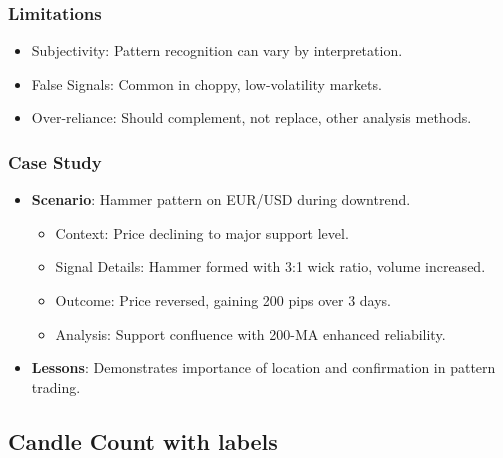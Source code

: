 \documentclass[12pt]{article}
\begin{document}
\subsubsection{Limitations}
\begin{itemize}
\item Subjectivity: Pattern recognition can vary by interpretation.
\item False Signals: Common in choppy, low-volatility markets.
\item Over-reliance: Should complement, not replace, other analysis methods.
\end{itemize}

\subsubsection{Case Study}
\begin{itemize}
\item \textbf{Scenario}: Hammer pattern on EUR/USD during downtrend.
  \begin{itemize}
  \item Context: Price declining to major support level.
  \item Signal Details: Hammer formed with 3:1 wick ratio, volume increased.
  \item Outcome: Price reversed, gaining 200 pips over 3 days.
  \item Analysis: Support confluence with 200-MA enhanced reliability.
  \end{itemize}
\item \textbf{Lessons}: Demonstrates importance of location and confirmation in pattern trading.
\end{itemize}

\subsection{Candle Count with labels}
\label{subsec:candle_count}
\end{document}
